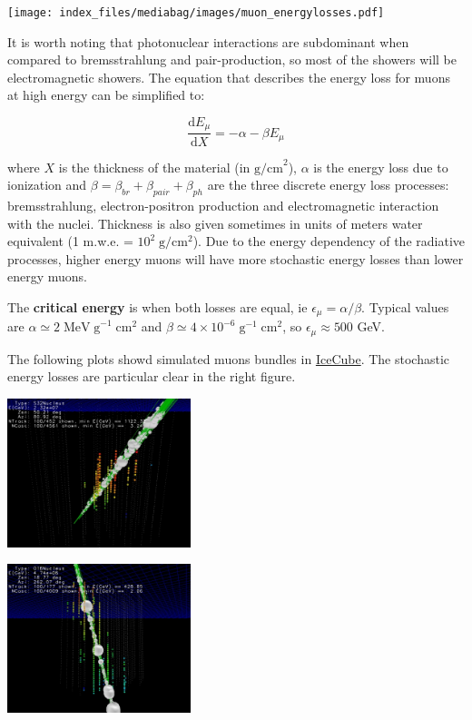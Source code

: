 \documentclass[
  letterpaper,
  DIV=11,
  numbers=noendperiod]{scrreprt}
\begin{document}
\begin{center}
\texttt{[image: index\_files/mediabag/images/muon\_energylosses.pdf]}
\end{center}

It is worth noting that photonuclear interactions are subdominant when
compared to bremsstrahlung and pair-production, so most of the showers
will be electromagnetic showers. The equation that describes the energy
loss for muons at high energy can be simplified to:

\[\frac{\mathrm{ d}E_\mu}{\mathrm{ d}X} = -\alpha -\beta E_\mu\]

where \(X\) is the thickness of the material (in \(\mathrm{ g/cm}^2\)),
\(\alpha\) is the energy loss due to ionization and
\(\beta = \beta_{br} + \beta_{pair} + \beta_{ph}\) are the three
discrete energy loss processes: bremsstrahlung, electron-positron
production and electromagnetic interaction with the nuclei. Thickness is
also given sometimes in units of meters water equivalent (1 m.w.e. =
\(10^2 \mathrm{\; g/cm^2}\)). Due to the energy dependency of the
radiative processes, higher energy muons will have more stochastic
energy losses than lower energy muons.

The \textbf{critical energy} is when both losses are equal, ie
\(\epsilon_\mu = \alpha/\beta\). Typical values are
\(\alpha \simeq 2 \mathrm{ \;MeV\;g}^{-1} \mathrm{ \;cm}^2\) and
\(\beta \simeq 4 \times 10^{-6} \;\mathrm{ g^{-1}\;cm^2}\), so
\(\epsilon_\mu \approx 500\) GeV.

The following plots showd simulated muons bundles in
\href{https:icecube.wisc.edu}{IceCube}. The stochastic energy losses are
particular clear in the right figure.

\begin{center}
\includegraphics[width=0.4\textwidth,height=\textheight]{images/musmooth.jpg}
\end{center}
\begin{center}
\includegraphics[width=0.4\textwidth,height=\textheight]{images/mustochastic.jpg}
\end{center}
\end{document}
